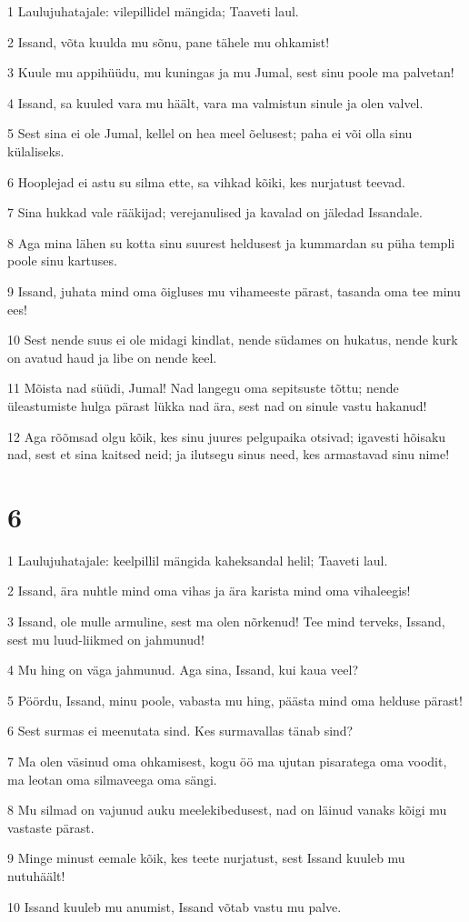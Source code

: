 \par 1 Laulujuhatajale: vilepillidel mängida; Taaveti laul.
\par 2 Issand, võta kuulda mu sõnu, pane tähele mu ohkamist!
\par 3 Kuule mu appihüüdu, mu kuningas ja mu Jumal, sest sinu poole ma palvetan!
\par 4 Issand, sa kuuled vara mu häält, vara ma valmistun sinule ja olen valvel.
\par 5 Sest sina ei ole Jumal, kellel on hea meel õelusest; paha ei või olla sinu külaliseks.
\par 6 Hooplejad ei astu su silma ette, sa vihkad kõiki, kes nurjatust teevad.
\par 7 Sina hukkad vale rääkijad; verejanulised ja kavalad on jäledad Issandale.
\par 8 Aga mina lähen su kotta sinu suurest heldusest ja kummardan su püha templi poole sinu kartuses.
\par 9 Issand, juhata mind oma õigluses mu vihameeste pärast, tasanda oma tee minu ees!
\par 10 Sest nende suus ei ole midagi kindlat, nende südames on hukatus, nende kurk on avatud haud ja libe on nende keel.
\par 11 Mõista nad süüdi, Jumal! Nad langegu oma sepitsuste tõttu; nende üleastumiste hulga pärast lükka nad ära, sest nad on sinule vastu hakanud!
\par 12 Aga rõõmsad olgu kõik, kes sinu juures pelgupaika otsivad; igavesti hõisaku nad, sest et sina kaitsed neid; ja ilutsegu sinus need, kes armastavad sinu nime!

\chapter{6}

\par 1 Laulujuhatajale: keelpillil mängida kaheksandal helil; Taaveti laul.
\par 2 Issand, ära nuhtle mind oma vihas ja ära karista mind oma vihaleegis!
\par 3 Issand, ole mulle armuline, sest ma olen nõrkenud! Tee mind terveks, Issand, sest mu luud-liikmed on jahmunud!
\par 4 Mu hing on väga jahmunud. Aga sina, Issand, kui kaua veel?
\par 5 Pöördu, Issand, minu poole, vabasta mu hing, päästa mind oma helduse pärast!
\par 6 Sest surmas ei meenutata sind. Kes surmavallas tänab sind?
\par 7 Ma olen väsinud oma ohkamisest, kogu öö ma ujutan pisaratega oma voodit, ma leotan oma silmaveega oma sängi.
\par 8 Mu silmad on vajunud auku meelekibedusest, nad on läinud vanaks kõigi mu vastaste pärast.
\par 9 Minge minust eemale kõik, kes teete nurjatust, sest Issand kuuleb mu nutuhäält!
\par 10 Issand kuuleb mu anumist, Issand võtab vastu mu palve.

